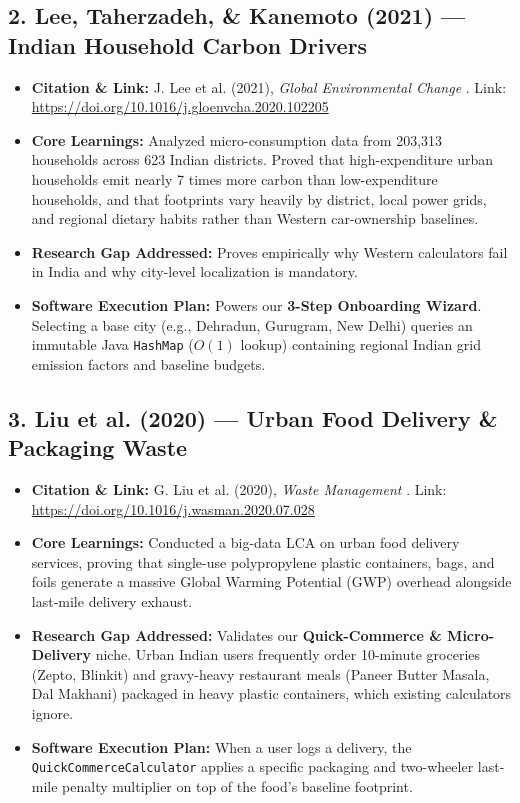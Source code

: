 \documentclass[12pt, a4paper]{article}
\begin{document}
\subsection{2. Lee, Taherzadeh, \& Kanemoto (2021) --- Indian Household Carbon Drivers}
\begin{itemize}[leftmargin=*]
    \item \textbf{Citation \& Link:} J. Lee et al. (2021), \textit{Global Environmental Change} \cite{lee2021india}. Link: \href{https://doi.org/10.1016/j.gloenvcha.2020.102205}{https://doi.org/10.1016/j.gloenvcha.2020.102205}
    \item \textbf{Core Learnings:} Analyzed micro-consumption data from 203,313 households across 623 Indian districts. Proved that high-expenditure urban households emit nearly 7 times more carbon than low-expenditure households, and that footprints vary heavily by district, local power grids, and regional dietary habits rather than Western car-ownership baselines.
    \item \textbf{Research Gap Addressed:} Proves empirically why Western calculators fail in India and why city-level localization is mandatory.
    \item \textbf{Software Execution Plan:} Powers our \textbf{3-Step Onboarding Wizard}. Selecting a base city (e.g., Dehradun, Gurugram, New Delhi) queries an immutable Java \texttt{HashMap} ($O(1)$ lookup) containing regional Indian grid emission factors and baseline budgets.
\end{itemize}

\subsection{3. Liu et al. (2020) --- Urban Food Delivery \& Packaging Waste}
\begin{itemize}[leftmargin=*]
    \item \textbf{Citation \& Link:} G. Liu et al. (2020), \textit{Waste Management} \cite{liu2020packaging}. Link: \href{https://doi.org/10.1016/j.wasman.2020.07.028}{https://doi.org/10.1016/j.wasman.2020.07.028}
    \item \textbf{Core Learnings:} Conducted a big-data LCA on urban food delivery services, proving that single-use polypropylene plastic containers, bags, and foils generate a massive Global Warming Potential (GWP) overhead alongside last-mile delivery exhaust.
    \item \textbf{Research Gap Addressed:} Validates our \textbf{Quick-Commerce \& Micro-Delivery} niche. Urban Indian users frequently order 10-minute groceries (Zepto, Blinkit) and gravy-heavy restaurant meals (Paneer Butter Masala, Dal Makhani) packaged in heavy plastic containers, which existing calculators ignore.
    \item \textbf{Software Execution Plan:} When a user logs a delivery, the \texttt{QuickCommerceCalculator} applies a specific packaging and two-wheeler last-mile penalty multiplier on top of the food's baseline footprint.
\end{itemize}
\end{document}
